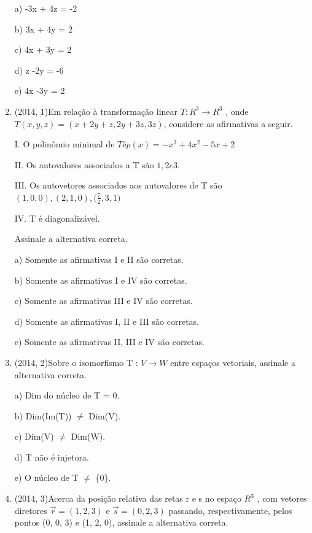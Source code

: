 \documentclass{article}
\begin{document}
\begin{enumerate}
a) -3x + 4z = -2

b) 3x + 4y = 2

c) 4x + 3y = 2

d) z -2y = -6

e) 4x -3y = 2\newline







\item(2014, 1)Em relação à transformação linear $T : R^3 → R^3$ , onde $T (x, y, z) = (x + 2y + z, 2y + 3z, 3z)$, considere as afirmativas a seguir.

I. O polinômio minimal de $T é p(x) = -x^3 + 4x^2 - 5x + 2$

II. Os autovalores associados a T são $1, 2 e 3$.

III. Os autovetores associados aos autovalores de T são $(1, 0, 0), (2, 1, 0),\bigg( \frac{7}{2}, 3, 1\bigg)$

IV. T é diagonalizável.

Assinale a alternativa correta.\newline

a) Somente as afirmativas I e II são corretas.

b) Somente as afirmativas I e IV são corretas.

c) Somente as afirmativas III e IV são corretas.

d) Somente as afirmativas I, II e III são corretas.

e) Somente as afirmativas II, III e IV são corretas.\newline






\item(2014, 2)Sobre o isomorfismo T : $V \rightarrow W$ entre espaços vetoriais, assinale a alternativa correta.\newline

a) Dim do núcleo de T = 0.

b) Dim(Im(T)) $\ne$ Dim(V).

c) Dim(V) $\ne$  Dim(W).

d) T não é injetora.

e) O núcleo de T $\ne$  \{0\}.\newline






\item(2014, 3)Acerca da posição relativa das retas r e s no espaço $R^3$ , com vetores diretores $\vec r = (1, 2, 3)$ e $\vec s = (0, 2, 3)$ passando, respectivamente, pelos pontos (0, 0, 3) e (1, 2, 0), assinale a alternativa correta.\newline


\end{enumerate}
\end{document}
